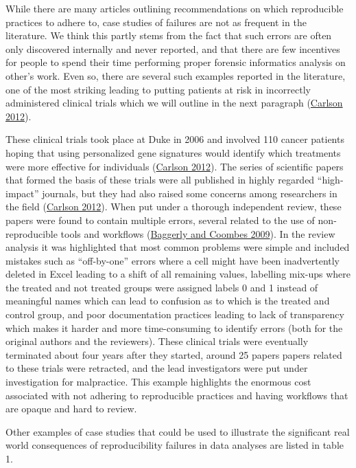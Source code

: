 \documentclass{article}
\begin{document}
While there are many articles outlining recommendations on which
reproducible practices to adhere to, case studies of failures are not as
frequent in the literature. We think this partly stems from the fact
that such errors are often only discovered internally and never
reported, and that there are few incentives for people to spend their
time performing proper forensic informatics analysis on other's work.
Even so, there are several such examples reported in the literature, one
of the most striking leading to putting patients at risk in incorrectly
administered clinical trials which we will outline in the next paragraph
(\protect\hyperlink{ref-carlson_carlson_2012}{Carlson 2012}).

These clinical trials took place at Duke in 2006 and involved 110 cancer
patients hoping that using personalized gene signatures would identify
which treatments were more effective for individuals
(\protect\hyperlink{ref-carlson_carlson_2012}{Carlson 2012}). The series
of scientific papers that formed the basis of these trials were all
published in highly regarded ``high-impact'' journals, but they had also
raised some concerns among researchers in the field
(\protect\hyperlink{ref-carlson_carlson_2012}{Carlson 2012}). When put
under a thorough independent review, these papers were found to contain
multiple errors, several related to the use of non-reproducible tools
and workflows (\protect\hyperlink{ref-baggerly2009deriving}{Baggerly and
Coombes 2009}). In the review analysis it was highlighted that most
common problems were simple and included mistakes such as ``off-by-one''
errors where a cell might have been inadvertently deleted in Excel
leading to a shift of all remaining values, labelling mix-ups where the
treated and not treated groups were assigned labels 0 and 1 instead of
meaningful names which can lead to confusion as to which is the treated
and control group, and poor documentation practices leading to lack of
transparency which makes it harder and more time-consuming to identify
errors (both for the original authors and the reviewers). These clinical
trials were eventually terminated about four years after they started,
around 25 papers papers related to these trials were retracted, and the
lead investigators were put under investigation for malpractice. This
example highlights the enormous cost associated with not adhering to
reproducible practices and having workflows that are opaque and hard to
review.

Other examples of case studies that could be used to illustrate the
significant real world consequences of reproducibility failures in data
analyses are listed in table 1.
\end{document}
